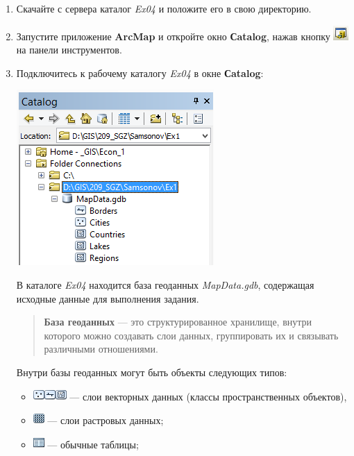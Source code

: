 \documentclass[12pt,]{book}
\providecommand{\tightlist}{%
  \setlength{\itemsep}{0pt}\setlength{\parskip}{0pt}}
\begin{document}
\begin{enumerate}
\def\labelenumi{\arabic{enumi}.}
\item
  Скачайте с сервера каталог \emph{Ex04} и положите его в свою директорию.
\item
  Запустите приложение \textbf{ArcMap} и откройте окно \textbf{Сatalog}, нажав кнопку \includegraphics{images/Ex01/image2.png} на панели инструментов.
\item
  Подключитесь к рабочему каталогу \emph{Ex04} в окне \textbf{Сatalog}:

  \includegraphics{images/Ex04/image2.png}

  В каталоге \emph{Ex04} находится база геоданных \emph{MapData.gdb}, содержащая исходные данные для выполнения задания.

  \begin{quote}
  \textbf{База геоданных} --- это структурированное хранилище, внутри которого можно создавать слои данных, группировать их и связывать различными отношениями.
  \end{quote}

  Внутри базы геоданных могут быть объекты следующих типов:

  \begin{itemize}
  \tightlist
  \item
    \includegraphics{images/Ex04/image3.png}\includegraphics{images/Ex04/image4.png}\includegraphics{images/Ex04/image5.png} --- слои векторных данных (классы пространственных объектов),
  \item
    \includegraphics{images/Ex04/image6.png} --- слои растровых данных;
  \item
    \includegraphics{images/Ex04/image7.png} --- обычные таблицы;
  \end{itemize}


\end{enumerate}
\end{document}

